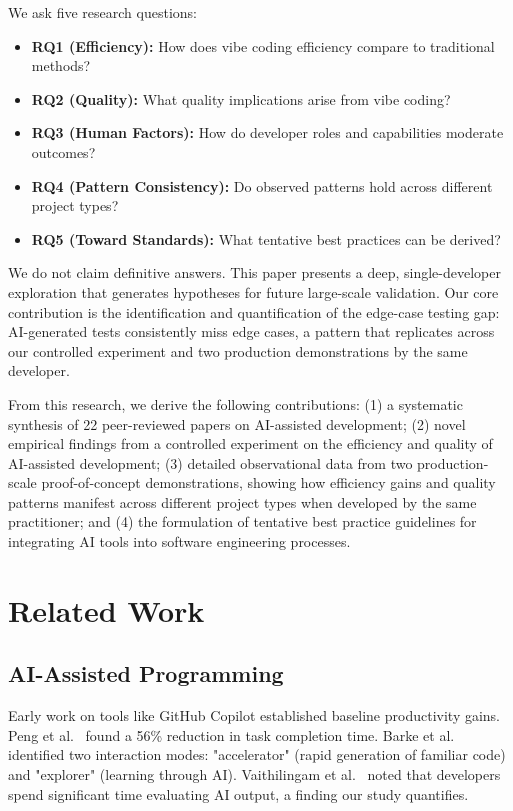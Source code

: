 \documentclass[sigconf]{acmart}
\begin{document}
We ask five research questions:
\begin{itemize}
    \item \textbf{RQ1 (Efficiency):} How does vibe coding efficiency compare to traditional methods?
    \item \textbf{RQ2 (Quality):} What quality implications arise from vibe coding?
    \item \textbf{RQ3 (Human Factors):} How do developer roles and capabilities moderate outcomes?
    \item \textbf{RQ4 (Pattern Consistency):} Do observed patterns hold across different project types?
    \item \textbf{RQ5 (Toward Standards):} What tentative best practices can be derived?
\end{itemize}

We do not claim definitive answers. This paper presents a deep, single-developer exploration that generates hypotheses for future large-scale validation. Our core contribution is the identification and quantification of the edge-case testing gap: AI-generated tests consistently miss edge cases, a pattern that replicates across our controlled experiment and two production demonstrations by the same developer.

From this research, we derive the following contributions: (1) a systematic synthesis of 22 peer-reviewed papers on AI-assisted development; (2) novel empirical findings from a controlled experiment on the efficiency and quality of AI-assisted development; (3) detailed observational data from two production-scale proof-of-concept demonstrations, showing how efficiency gains and quality patterns manifest across different project types when developed by the same practitioner; and (4) the formulation of tentative best practice guidelines for integrating AI tools into software engineering processes.

\section{Related Work}

\subsection{AI-Assisted Programming}

Early work on tools like GitHub Copilot established baseline productivity gains. Peng et al.~\cite{peng2023impact} found a 56\% reduction in task completion time. Barke et al.~\cite{barke2023grounded} identified two interaction modes: "accelerator" (rapid generation of familiar code) and "explorer" (learning through AI). Vaithilingam et al.~\cite{vaithilingam2022expectation} noted that developers spend significant time evaluating AI output, a finding our study quantifies.
\end{document}
